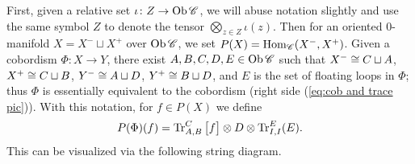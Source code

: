 \documentclass[12pt,oneside,article,draft]{memoir}
\begin{document}
First, given a relative set
$\iota\colon Z\to\operatorname{Ob}\mathscr{C}$, we will abuse notation slightly and use the same symbol $Z$ to denote
the tensor $\bigotimes_{z\in Z}\iota(z)$.  Then for an oriented 0-manifold $X=X^-\sqcup X^+$ over $\operatorname{Ob}\mathscr{C}$, we
set $P(X)=\operatorname{Hom}_{\mathscr{C}}(X^-,X^+)$.  Given a cobordism $\Phi\colon X\to Y$, there exist
$A,B,C,D,E\in\operatorname{Ob}\mathscr{C}$ such that $X^-\cong C\sqcup A$, $X^+\cong C\sqcup B$,
$Y^-\cong A\sqcup D$, $Y^+\cong B\sqcup D$, and $E$ is the set of floating loops in $\Phi$;
thus $\Phi$ is essentially equivalent to the cobordism (right side (\ref{eq:cob and trace pic})).
With this notation, for $f\in P(X)$ we define
\begin{equation}\label{eq:cob algebra formula}
   P(\Phi)(f)=\operatorname{Tr}_{A,B}^C\big[f\big]\otimes D\otimes\operatorname{Tr}^E_{I,I}(E).
\end{equation}
This can be visualized via the following string diagram.
\end{document}
